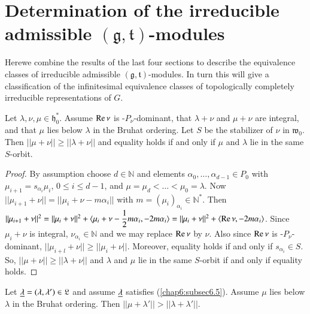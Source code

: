 
\chapter{Determination of the irreducible admissible $(\mathfrak{g},
  \mathfrak{t})$-modules}\label{sec10}

Here\pageoriginale we combine the results of the last four sections to
describe the equivalence classes of irreducible admissible
$(\mathfrak{g}, \mathfrak{t})$-modules. In turn this will give a
classification of the infinitesimal equivalence classes of
topologically completely irreducible representations of $G$. 

\begin{lemma}\label{chap10:lem10.1}
Let $\lambda, \nu, \mu \in \mathfrak{h}^*_0$. Assume $\operatorname{Re} \nu$ is
-$P_\nu$-dominant, that $\lambda + \nu$ and $\mu + \nu$ are integral,
and that $\mu$ lies below $\lambda$ in the Bruhat ordering. Let $S$ be
the stabilizer of $\nu$ in $\mathfrak{w}_0$. Then $||\mu + \nu|| \geq
||\lambda + \nu ||$ and equality holds if and only if $\mu$ and
$\lambda$ lie in the same $S$-orbit. 
\end{lemma}

\begin{proof}
By assumption choose $d \in \mathbb{N}$ and elements $\alpha_0 ,\ldots
, \alpha_{d-1} \in P_0$ with $\mu_{i+1} = s_{\alpha_i} \mu_i$, $0
\leq i \leq d -1$, and $\mu = \mu_d < \ldots < \mu_0 = \lambda$. Now
$||\mu_{i+1} + \nu|| = ||\mu_i + \nu - m \alpha_i||$ with $m =
(\mu_i)_{\alpha_i} \in \mathbb{N}^*$. Then $||\mu_{i+1} + \nu||^2 =
||\mu_i + \nu||^2 + \langle \mu_i + \nu - \dfrac{1}{2} m \alpha_i, - 2
m \alpha_i \rangle = ||\mu_i + \nu||^2 + \langle \operatorname{Re} \nu, -2 m
\alpha_i\rangle $. Since $\mu_i + \nu$ is integral, $\nu_{\alpha_i}
\in \mathbb{N}$ and we may replace $\operatorname{Re} \nu $ by $\nu$. Also since
$\operatorname{Re} \nu$ is -$P_\nu$-dominant, $||\mu_{i+l} + \nu || \geq ||\mu_i +
\nu||$. Moreover, equality holds if and only if $s_{\alpha_i} \in
S$. So, $||\mu + \nu || \geq ||\lambda + \nu||$ and $\lambda$ and
$\mu$ lie in the same $S$-orbit if and only if equality holds. 
 \end{proof}

\begin{coro}\label{chap10:coro10.2}
Let $\underline{\lambda} = (\lambda, \lambda') \in \mathfrak{L}$ and assume
$\underline{\lambda}$ satisfies (\ref{chap6:subsec6.5}). Assume $\mu$ lies below $\lambda$ in 
the Bruhat ordering. Then $||\mu + \lambda'|| > || \lambda +
\lambda'||$. 
\end{coro}

